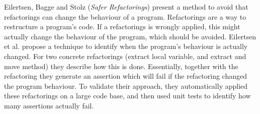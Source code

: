 

Eilertsen, Bagge and Stolz
\cite{isola-2016-eilertsen}
({\em Safer Refactorings})
present a method to avoid that refactorings can change the behaviour
of a program. 
Refactorings are a way to restructure a program's code. If a
refactorings is wrongly applied, this might actually change the
behaviour of the program, which should be avoided. Eilertsen et al. propose a technique to identify when the program's behaviour is actually changed. For two concrete refactorings (extract local variable, and extract and move method) they describe how this is done. Essentially, together with the refactoring they generate an assertion which will fail if the refactoring changed the program behaviour. To validate their approach, they automatically applied these refactorings on a large code base, and then used unit tests to identify how many assertions actually fail.
